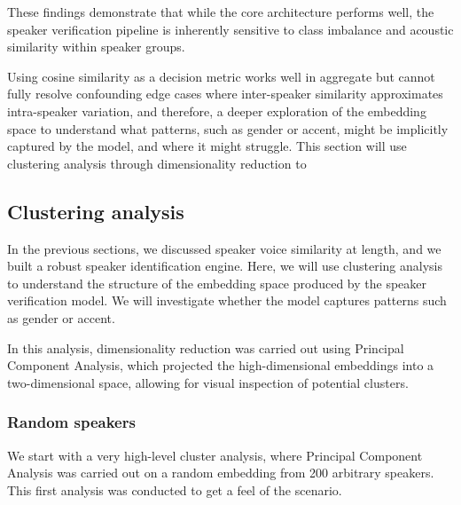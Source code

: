 \documentclass[conference]{IEEEtran}
\begin{document}
These findings demonstrate that while the core architecture performs well, the speaker verification pipeline is inherently sensitive to class imbalance and acoustic similarity within speaker groups. 

Using cosine similarity as a decision metric works well in aggregate but cannot fully resolve confounding edge cases where inter-speaker similarity approximates intra-speaker variation, and therefore, a deeper exploration of the embedding space to understand what patterns, such as gender or accent, might be implicitly captured by the model, and where it might struggle. This section will use clustering analysis through dimensionality reduction to 

\subsection{Clustering analysis}

In the previous sections, we discussed speaker voice similarity at length, and we built a robust speaker identification engine. Here, we will use clustering analysis to understand the structure of the embedding space produced by the speaker verification model. We will investigate whether the model captures patterns such as gender or accent.

In this analysis, dimensionality reduction was carried out using Principal Component Analysis, which projected the high-dimensional embeddings into a two-dimensional space, allowing for visual inspection of potential clusters.


\subsubsection{Random speakers}


We start with a very high-level cluster analysis, where Principal Component Analysis was carried out on a random embedding from 200 arbitrary speakers. This first analysis was conducted to get a feel of the scenario.
\end{document}
